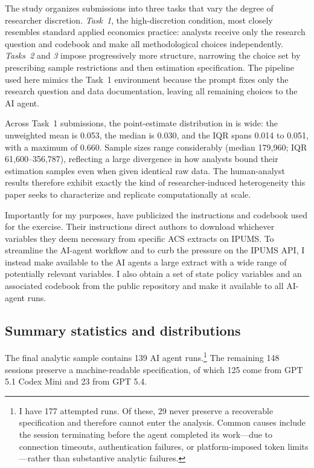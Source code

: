 \documentclass[12pt]{article}
\begin{document}
The study organizes submissions into three tasks that vary the degree of researcher discretion. \emph{Task~1}, the high-discretion condition, most closely resembles standard applied economics practice: analysts receive only the research question and codebook and make all methodological choices independently. \emph{Tasks~2} and \emph{3} impose progressively more structure, narrowing the choice set by prescribing sample restrictions and then estimation specification. The pipeline used here mimics the Task~1 environment because the prompt fixes only the research question and data documentation, leaving all remaining choices to the AI agent.

Across Task~1 submissions, the point-estimate distribution in \citet{huntingtonklein2025sources} is wide: the unweighted mean is 0.053, the median is 0.030, and the IQR spans 0.014 to 0.051, with a maximum of 0.660. Sample sizes range considerably (median 179{,}960; IQR 61{,}600--356{,}787), reflecting a large divergence in how analysts bound their estimation samples even when given identical raw data. The human-analyst results therefore exhibit exactly the kind of researcher-induced heterogeneity this paper seeks to characterize and replicate computationally at scale.

Importantly for my purposes, \citet{huntingtonklein2025sources} have publicized the instructions and codebook used for the exercise. Their instructions direct authors to download whichever variables they deem necessary from specific ACS extracts on IPUMS. To streamline the AI-agent workflow and to curb the pressure on the IPUMS API, I instead make available to the AI agents a large extract with a wide range of potentially relevant variables. I also obtain a set of state policy variables and an associated codebook from the \citet{huntingtonklein2025sources} public repository and make it available to all AI-agent runs.

\subsection{Summary statistics and distributions}
The final analytic sample contains 139 AI agent runs.\footnote{I have 177 attempted runs. Of these, 29 never preserve a recoverable specification and therefore cannot enter the analysis. Common causes include the session terminating before the agent completed its work---due to connection timeouts, authentication failures, or platform-imposed token limits---rather than substantive analytic failures.} The remaining 148 sessions preserve a machine-readable specification, of which 125 come from GPT 5.1 Codex Mini and 23 from GPT 5.4.
\end{document}
